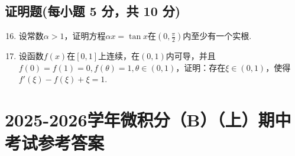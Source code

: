 \documentclass[../Main.tex]{subfiles}
\begin{document}
\section{证明题(每小题 5 分，共 10 分)}
\begin{enumerate}
    \setcounter{enumi}{15}
    \item 设常数$\alpha>1$，证明方程$\alpha x=\tan x$在$\left(0,\frac{\pi}{2}
              \right)$内至少有一个实根.
          \vspace{10em}

    \item 设函数$f(x)$在$[0,1]$上连续，在$(0,1)$内可导，并且$f(0)=f(1)=0,f(\theta
              )=1,\theta\in(0,1)$，证明：存在$\xi\in(0,1)$，使得$f'(\xi)-f(\xi)+\xi=1$.
          \vspace{8em}
\end{enumerate}

\chapter{2025-2026学年微积分（B）（上）期中考试参考答案}
\end{document}
